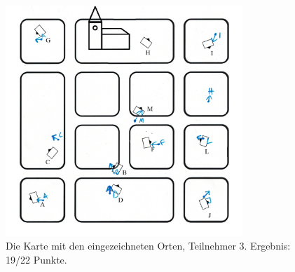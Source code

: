 \begin{figure}[]
  \centering
  \includegraphics[width=0.8\textwidth]{images/map_full_with_curch_a.png}
  \caption{Die Karte mit den eingezeichneten Orten, Teilnehmer 3. Ergebnis: 19/22 Punkte.}
  \label{fig:todo}
\end{figure}


